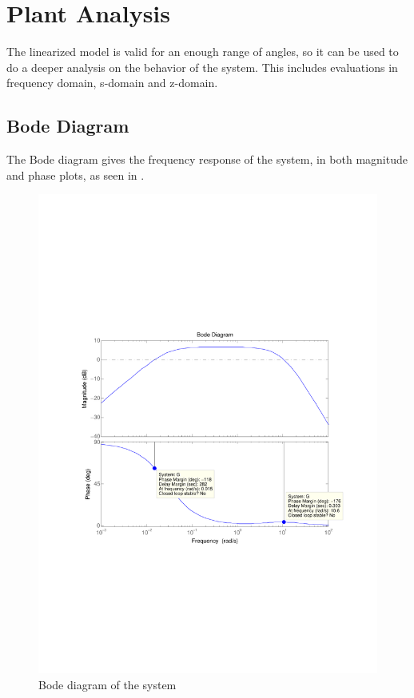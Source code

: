 \section{Plant Analysis}
The linearized model is valid for an enough range of angles, so it can be used to do a deeper analysis on the behavior of the system. This includes evaluations in frequency domain, s-domain and z-domain.

\subsection{Bode Diagram}
The Bode diagram gives the frequency response of the system, in both magnitude and phase plots, as seen in .
\begin{figure}[H] 
	\centering 
	\includegraphics[scale=0.65]{figures/bodeTF}
	\centering
	\captionsetup{justification=centering}	
	\caption{Bode diagram of the system}
	\label{bodeTF}
\end{figure}

